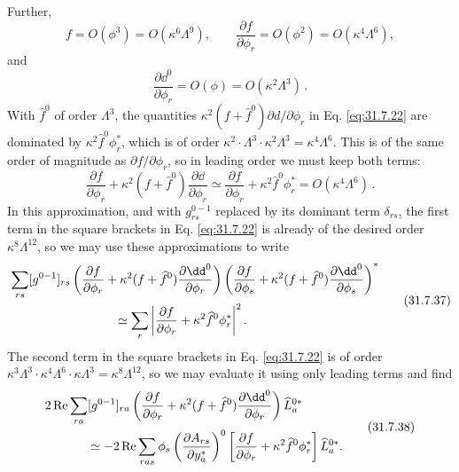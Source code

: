 Further,
\begin{equation}
  f=O(\phi^3)=O(\kappa^6\Lambda^9),\qquad
  \frac{\partial f}{\partial\phi_r}
  =O(\phi^2)=O(\kappa^4\Lambda^6),
  \tag{31.7.34}\label{eq:31.7.34}
\end{equation}
and
\begin{equation}
  \frac{\partial \dd^0}{\partial\phi_r}
  =O(\phi)=O(\kappa^2\Lambda^3)\,.
  \tag{31.7.35}\label{eq:31.7.35}
\end{equation}
With \(\widehat f^0\) of order \(\Lambda^3\), the quantities
\(\kappa^2(f+\widehat f^0)\partial d/\partial\phi_r\) in
Eq. \eqref{eq:31.7.22} are dominated by
\(\kappa^2\widehat f^0\phi_r^*\), which is of order
\(\kappa^2\cdot\Lambda^3\cdot\kappa^2\Lambda^3
=\kappa^4\Lambda^6\). This is of the same order of magnitude as
\(\partial f/\partial\phi_r\), so in leading order we must keep both terms:
\begin{equation}
  \frac{\partial f}{\partial\phi_r}
  +\kappa^2(f+\widehat f^0)\frac{\partial \dd}{\partial\phi_r}
  \simeq
  \frac{\partial f}{\partial\phi_r}
  +\kappa^2\widehat f^0\phi_r^*
  =O(\kappa^4\Lambda^6)\,.
  \tag{31.7.36}\label{eq:31.7.36}
\end{equation}
In this approximation, and with \(g_{rs}^{0-1}\) replaced by its dominant
term \(\delta_{rs}\), the first term in the square brackets in
Eq. \eqref{eq:31.7.22} is already of the desired order
\(\kappa^8\Lambda^{12}\), so we may use these approximations to write
\begin{equation}
  \begin{aligned}
  &\sum_{rs}[g^{0-1}]_{rs}
  \left(
    \frac{\partial f}{\partial\phi_r}
    +\kappa^2(f+\widehat f^0)\frac{\partial \dd^0}{\partial\phi_r}
  \right)
  \left(
    \frac{\partial f}{\partial\phi_s}
    +\kappa^2(f+\widehat f^0)\frac{\partial \dd^0}{\partial\phi_s}
  \right)^*
  \\
  &\hspace{30mm}\simeq
  \sum_r\left|
    \frac{\partial f}{\partial\phi_r}
    +\kappa^2\widehat f^0\phi_r^*
  \right|^2 .
  \end{aligned}
  \tag{31.7.37}\label{eq:31.7.37}
\end{equation}
The second term in the square brackets in Eq. \eqref{eq:31.7.22} is of
order
\(\kappa^3\Lambda^3\cdot\kappa^4\Lambda^6\cdot\kappa\Lambda^3
=\kappa^8\Lambda^{12}\), so we may evaluate it using only leading terms and
find
\begin{equation}
  \begin{aligned}
  &2\operatorname{Re}\sum_{ra}[g^{0-1}]_{ra}
  \left(
    \frac{\partial f}{\partial\phi_r}
    +\kappa^2(f+\widehat f^0)\frac{\partial \dd^0}{\partial\phi_r}
  \right)\widehat L_a^{0*}
  \\
  &\hspace{12mm}\simeq
  -2\operatorname{Re}\sum_{ras}\phi_s
  \left(\frac{\partial A_{rs}}{\partial y_a^*}\right)^0
  \left[
    \frac{\partial f}{\partial\phi_r}
    +\kappa^2\widehat f^0\phi_r^*
  \right]\widehat L_a^{0*}.
  \end{aligned}
  \tag{31.7.38}\label{eq:31.7.38}
\end{equation}
